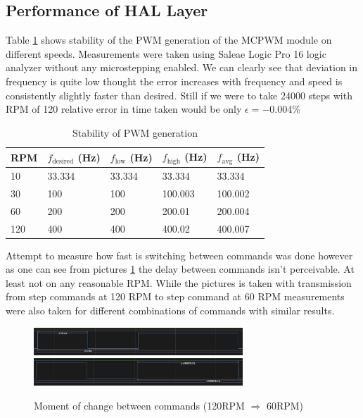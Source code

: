 \subsection{Performance of HAL Layer}


Table \ref{tab:performancepwm} shows stability of the PWM generation of the MCPWM module on different speeds.
Measurements were taken using Saleae Logic Pro 16 logic analyzer without any microstepping enabled.
We can clearly see that deviation in frequency is quite low thought the error increases with frequency and speed is consistently slightly faster than desired.
Still if we were to take 24000 steps with RPM of 120 relative error in time taken would be only $\epsilon = -0.004\%$


\begin{table}[h!]
  \centering
  \caption[Stability of PWM generation]{Stability of PWM generation}
  \begin{tabular}{| m{2cm} || m{2.5cm} | m{2.5cm} | m{2.5cm} | m{2.5cm} |}
    \hline
    RPM & $f_{\mathrm{desired}}$ (Hz) & $f_{\mathrm{low}}$ (Hz) & $f_{\mathrm{high}}$ (Hz) & $f_\mathrm{avg}$ (Hz) \\
    \hline
    10  & 33.334                      & 33.334                  & 33.334                   & 33.334                \\
    30  & 100                         & 100                     & 100.003                  & 100.002               \\
    60  & 200                         & 200                     & 200.01                   & 200.004               \\
    120 & 400                         & 400                     & 400.02                   & 400.007               \\
    \hline
  \end{tabular}
  \label{tab:performancepwm}
\end{table}

Attempt to measure how fast is switching between commands was done however as one can see from pictures
\ref{fig:switching}  the delay between commands isn't perceivable.
At least not on any reasonable RPM.
While the pictures is taken with transmission from step commands at 120 RPM to step command at 60 RPM measurements were also taken for different combinations of commands with similar results.

\begin{figure}[h!]
	\centering
	\includegraphics[width=0.7\textwidth]{../img/120rpm_to60_1.jpg}
	\includegraphics[width=0.7\textwidth]{../img/120rpm_to60_2.jpg}
	\caption[Moment of change between commands with 120RPM and 60RPM]{Moment of change between commands (120RPM $\Rightarrow$  60RPM)}
	\label{fig:switching}
\end{figure}

